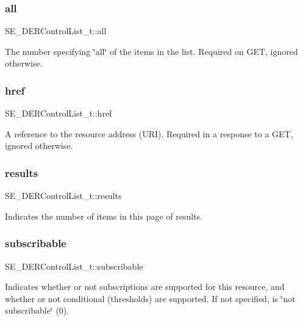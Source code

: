 \subsubsection{\texorpdfstring{all}{all}}
{\footnotesize\ttfamily S\+E\+\_\+\+D\+E\+R\+Control\+List\+\_\+t\+::all}

The number specifying \char`\"{}all\char`\"{} of the items in the list. Required on G\+ET, ignored otherwise. \mbox{\label{group__DERControlList_ga8ae02ab34efcdc073153919ae8ab74f5}} 
\subsubsection{\texorpdfstring{href}{href}}
{\footnotesize\ttfamily S\+E\+\_\+\+D\+E\+R\+Control\+List\+\_\+t\+::href}

A reference to the resource address (U\+RI). Required in a response to a G\+ET, ignored otherwise. \mbox{\label{group__DERControlList_gafeb66f551894913e0d3916884e8d506a}} 
\subsubsection{\texorpdfstring{results}{results}}
{\footnotesize\ttfamily S\+E\+\_\+\+D\+E\+R\+Control\+List\+\_\+t\+::results}

Indicates the number of items in this page of results. \mbox{\label{group__DERControlList_ga870a4642c096dbebeffa0037894b9b41}} 
\subsubsection{\texorpdfstring{subscribable}{subscribable}}
{\footnotesize\ttfamily S\+E\+\_\+\+D\+E\+R\+Control\+List\+\_\+t\+::subscribable}

Indicates whether or not subscriptions are supported for this resource, and whether or not conditional (thresholds) are supported. If not specified, is \char`\"{}not subscribable\char`\"{} (0). 